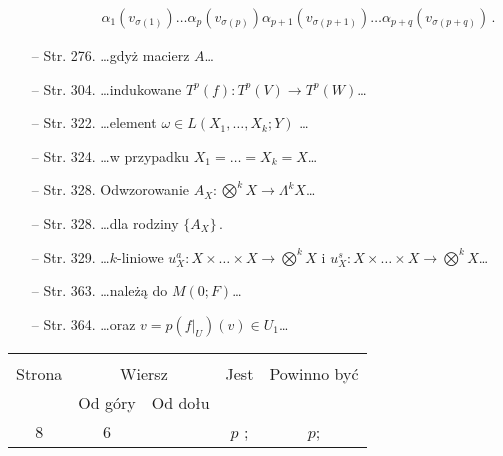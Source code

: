 \documentclass[a4paper,11pt]{article}
\begin{document}
\begin{itemize}
\begin{displaymath}
\begin{split}
      & \quad \qquad \alpha_{ 1 } ( v_{ \sigma( 1 ) } ) \ldots
      \alpha_{ p } ( v_{ \sigma ( p ) } ) \alpha_{ p + 1 } ( v_{
        \sigma( p + 1 ) } ) \ldots \alpha_{ p + q } ( v_{ \sigma ( p +
        q ) } ) \, .
    \end{split}
  \end{displaymath}
\item[--] Str. 276. \ldots gdyż macierz $A$\ldots
\item[--] Str. 304. \ldots indukowane
  $T^{ p } ( f ) : T^{ p } ( V ) \rightarrow T^{ p } (W)$\ldots
\item[--] Str. 322. \ldots element
  $\omega \in L( X_{ 1 } ,\ldots, X_{ k }; Y )$ \ldots
\item[--] Str. 324. \ldots w przypadku
  $X_{ 1 } = \ldots = X_{ k } = X$\ldots
\item[--] Str. 328. Odwzorowanie
  $A_{ X } : \bigotimes^{ k } X \rightarrow \Lambda^{ k } X$\ldots
\item[--] Str. 328. \ldots dla rodziny $\{ A_{ X } \} \, .$
\item[--] Str. 329. \ldots $k$-liniowe
  $u^{ a }_{ X } : X \times \ldots \times X \rightarrow \bigotimes^{ k
  } X$ i
  $u^{ s }_{ X } : X \times \ldots \times X \rightarrow \bigotimes^{ k
  } X$\ldots
\item[--] Str. 363. \ldots należą do $M( 0; F )$\ldots
\item[--] Str. 364. \ldots oraz
  $v = p( f |_{ U } ) ( v ) \in U_{ 1 }$\ldots
\end{itemize}









\begin{center}
  \begin{tabular}{|c|c|c|c|c|}
    \hline
    & \multicolumn{2}{c|}{} & & \\
    Strona & \multicolumn{2}{c|}{Wiersz} & Jest
                              & Powinno być \\ \cline{2-3}
    & Od góry & Od dołu & & \\
    \hline
    8   & 6 & & $p$ ; & $p$; \\
    \hline
  \end{tabular}
\end{center}
\end{document}
